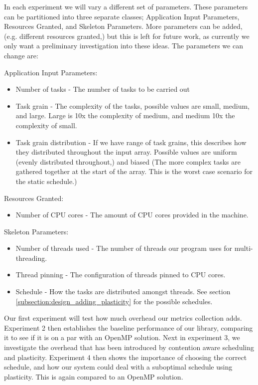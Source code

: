 In each experiment we will vary a different set of parameters. These parameters can be partitioned into three separate classes; Application Input Parameters, Resources Granted, and Skeleton Parameters. More parameters can be added, (e.g. different resources granted,) but this is left for future work, as currently we only want a preliminary investigation into these ideas. The parameters we can change are:

Application Input Parameters:

\begin{itemize}
	\item Number of tasks - The number of tasks to be carried out
	\item Task grain - The complexity of the tasks, possible values are small, medium, and large. Large is 10x the complexity of medium, and medium 10x the complexity of small.
	\item Task grain distribution - If we have range of task grains, this describes how they distributed throughout the input array. Possible values are uniform (evenly distributed throughout,) and biased (The more complex tasks are gathered together at the start of the array. This is the worst case scenario for the static schedule.)
\end{itemize}

Resources Granted:

\begin{itemize}
	\item Number of CPU cores - The amount of CPU cores provided in the machine.
\end{itemize}

Skeleton Parameters:

\begin{itemize}
	\item Number of threads used - The number of threads our program uses for multi-threading.
	\item Thread pinning - The configuration of threads pinned to CPU cores.
	\item Schedule - How the tasks are distributed amongst threads. See section \ref{subsection:design_adding_plasticity} for the possible schedules.
\end{itemize}

Our first experiment will test how much overhead our metrics collection adds. Experiment 2 then establishes the baseline performance of our library, comparing it to see if it is on a par with an OpenMP solution. Next in experiment 3, we investigate the overhead that has been introduced by contention aware scheduling and plasticity. Experiment 4 then shows the importance of choosing the correct schedule, and how our system could deal with a suboptimal schedule using plasticity. This is again compared to an OpenMP solution.

